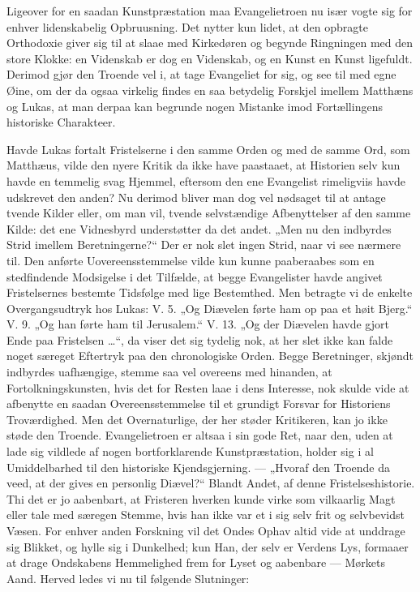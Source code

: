 \documentclass[12pt,a4paper]{book}
\begin{document}
Ligeover for en saadan Kunstpræstation maa Evangelietroen nu især vogte sig for enhver
lidenskabelig Opbruusning. Det nytter kun lidet, at den opbragte Orthodoxie giver sig
til at slaae med Kirkedøren og begynde Ringningen med den store Klokke: en Videnskab er
dog en Videnskab, og en Kunst en Kunst ligefuldt. Derimod gjør den Troende vel i, at
tage Evangeliet for sig, og see til med egne Øine, om der da ogsaa virkelig findes en
saa betydelig Forskjel imellem Matthæns og Lukas, at man derpaa kan begrunde nogen
Mistanke imod Fortællingens historiske Charakteer.

Havde Lukas fortalt Fristelserne i den samme Orden og med de samme Ord, som Matthæus,
vilde den nyere Kritik da ikke have paastaaet, at Historien selv kun havde en temmelig
svag Hjemmel, eftersom den ene Evangelist rimeligviis havde udskrevet den anden? Nu
derimod bliver man dog vel nødsaget til at antage tvende Kilder eller, om man vil,
tvende selvstændige Afbenyttelser af den samme Kilde: det ene Vidnesbyrd understøtter da
det andet. „Men nu den indbyrdes Strid imellem Beretningerne?“ Der er nok slet ingen
Strid, naar vi see nærmere til. Den anførte Uovereensstemmelse vilde kun kunne
paaberaabes som en stedfindende Modsigelse i det Tilfælde, at begge Evangelister havde
angivet Fristelsernes bestemte Tidsfølge med lige Bestemthed.
Men betragte vi de enkelte Overgangsudtryk hos Lukas: V. 5. „Og Diævelen førte ham op
paa et høit Bjerg.“ V. 9. „Og han førte ham til Jerusalem.“ V. 13. „Og der Diævelen
havde gjort Ende paa Fristelsen \dots“, da viser det sig tydelig nok, at her slet ikke
kan falde noget særeget Eftertryk paa den chronologiske Orden. Begge Beretninger,
skjøndt indbyrdes uafhængige, stemme saa vel overeens med hinanden, at
Fortolkningskunsten, hvis det for Resten laae i dens Interesse, nok skulde vide at
afbenytte en saadan Overeensstemmelse til et grundigt Forsvar for Historiens
Troværdighed. Men det Overnaturlige, der her støder Kritikeren, kan jo ikke støde den
Troende. Evangelietroen er altsaa i sin gode Ret, naar den, uden at lade sig vildlede af
nogen bortforklarende Kunstpræstation, holder sig i al Umiddelbarhed til den historiske
Kjendsgjerning. --- „Hvoraf den Troende da veed, at der gives en personlig Diævel?“
Blandt Andet, af denne Fristelseshistorie. Thi det er jo aabenbart, at Fristeren
hverken kunde virke som vilkaarlig Magt eller tale med særegen Stemme, hvis han ikke var
et i sig selv frit og selvbevidst Væsen. For enhver anden Forskning vil det Ondes Ophav
altid vide at unddrage sig Blikket, og hylle sig i Dunkelhed; kun Han, der selv er
Verdens Lys, formaaer at drage Ondskabens Hemmelighed frem for Lyset og aabenbare ---
Mørkets Aand. Herved ledes vi nu til følgende Slutninger:
\end{document}
